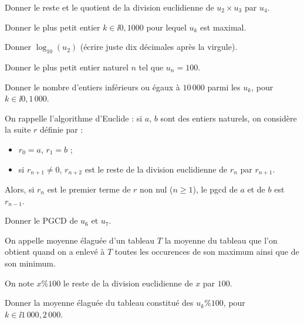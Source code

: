 


\question{} Donner le reste et le quotient de la division euclidienne de $u_2\times u_3$ par $u_4$.

\medskip

\question{} Donner le plus petit entier $k \in \ii{0,1000}$ pour lequel $u_k$ est maximal. 

\medskip 

\question{} Donner $\log_{10} (u_2)$ (écrire juste dix décimales après la virgule).


\question{} Donner le plus petit entier naturel $n$ tel que $u_n = 100$.

\medskip

\question{} Donner le nombre d'entiers inférieurs ou égaux à $10\,000$ parmi les $u_k$, pour $k \in \ii{0,1\,000}$.

\medskip

On rappelle l'algorithme d'Euclide : si $a$, $b$ sont des entiers naturels, on considère la suite $r$ définie par : 
\begin{itemize}
  \item $r_0 = a$, $r_1 = b$ ; 
  \item si $r_{n+1} \neq 0$, $r_{n+2}$ est le reste de la division euclidienne de $r_n$ par $r_{n+1}$.
\end{itemize}
Alors, si $r_n$ est le premier terme de $r$ non nul ($n\geq 1$), le pgcd de $a$ et de $b$ est $r_{n-1}$. 
\medskip

\question{} Donner le PGCD de $u_6$ et $u_7$.

\medskip

On appelle moyenne élaguée d'un tableau $T$ la moyenne du tableau que l'on obtient quand on a enlevé à $T$ toutes les occurences de son maximum ainsi que de son minimum.

On note $x \% 100$ le reste de la division euclidienne de $x$ par $100$.

\medskip

\question{}  Donner la moyenne élaguée du tableau constitué des $u_k \% 100$, pour $k\in \ii{1\,000,2\,000}$.

